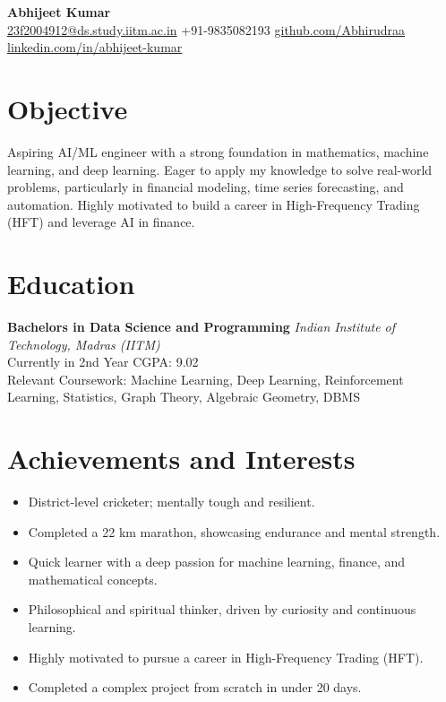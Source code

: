 \documentclass[a4paper,10pt]{article}
\begin{document}
\begin{center}
    {\LARGE \textbf{Abhijeet Kumar}} \\ 
    \href{mailto:23f2004912@ds.study.iitm.ac.in}{23f2004912@ds.study.iitm.ac.in} \textbullet{} +91-9835082193 \textbullet{} \href{https://github.com/Abhirudraa}{github.com/Abhirudraa} \textbullet{} \href{https://www.linkedin.com/in/abhijeet-kumar-b11206312/}{linkedin.com/in/abhijeet-kumar}
\end{center}

\section*{Objective}
Aspiring AI/ML engineer with a strong foundation in mathematics, machine learning, and deep learning. Eager to apply my knowledge to solve real-world problems, particularly in financial modeling, time series forecasting, and automation. Highly motivated to build a career in High-Frequency Trading (HFT) and leverage AI in finance.

\section*{Education}
\textbf{Bachelors in Data Science and Programming} \hfill \textit{Indian Institute of Technology, Madras (IITM)} \\
Currently in 2nd Year \textbullet{} CGPA: 9.02 \\
Relevant Coursework: Machine Learning, Deep Learning, Reinforcement Learning, Statistics, Graph Theory, Algebraic Geometry, DBMS

\section*{Achievements and Interests}
\begin{itemize}[left=0.15in]
    \item District-level cricketer; mentally tough and resilient.
    \item Completed a 22 km marathon, showcasing endurance and mental strength.
    \item Quick learner with a deep passion for machine learning, finance, and mathematical concepts.
    \item Philosophical and spiritual thinker, driven by curiosity and continuous learning.
    \item Highly motivated to pursue a career in High-Frequency Trading (HFT).
    \item Completed a complex project from scratch in under 20 days.
\end{itemize}
\end{document}
